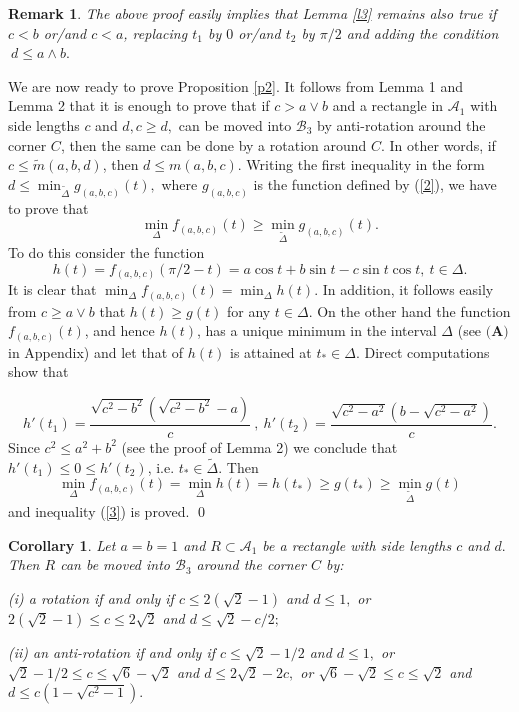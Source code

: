 \documentclass[12pt]{amsart}
\newtheorem{cor}[thm]{Corollary}
\newtheorem{rem}[thm]{Remark}
\def\A{\mathcal A}
\def\B{\mathcal B}
\def\DD{\Delta}
\def\w{\wedge}
\def\ss{\subset}
\begin{document}
\begin{rem}\label{r1} The above proof easily implies that Lemma \ref{l3}
remains also true if $c<b$ or/and $c<a$, replacing $t_1$ by $0$
or/and $t_2$ by $\pi/2$ and adding the condition $ \ d\le a\w b.$
\end{rem}

We are now ready to prove Proposition \ref{p2}. It follows from
Lemma 1 and Lemma 2 that it is enough to prove that if $c> a\vee b
$ and a rectangle in $\A_1$ with side lengths  $c$ and $d, c\ge d
,$ can be moved into $\B_3$ by anti-rotation around the corner
$C$, then the same can be done by a rotation around $C$. In other
words, if $c\le \widetilde{m}(a,b,d)$, then
 $d\le m(a,b,c).$ Writing  the first inequality in the form
$d\le \min_{\widetilde{\DD}}g_{(a,b,c)}(t) ,$ where $g_{(a,b,c)}$
is the function defined by (\ref{2}), we have to prove that
\begin{equation}\label{3}
\min_{\DD}f_{(a,b,c)}(t) \ge \min_{\widetilde{\DD}}g_{(a,b,c)}(t) .
\end{equation}
To do this consider the function
$$ h(t)= f_{(a,b,c)}(\pi/2-t)= a\cos t+b\sin t-c\sin t\cos t,\ t\in\DD.$$
It is clear that $\min_{\DD}f_{(a,b,c)}(t)=\min_{\DD}h(t).$ In
addition, it follows easily from $c\ge a\vee b $ that $h(t)\ge
g(t)$ for any $t\in\DD$. On the other hand the function
$f_{(a,b,c)}(t)$, and hence $h(t)$, has a unique minimum in the
interval $\DD$ (see $\textbf{(A)}$ in Appendix) and let that of
$h(t)$ is attained at $t_{\ast}\in \DD$. Direct computations show
that

$$h'(t_1) = \frac{\sqrt{c^2-b^2}(\sqrt{c^2-b^2}- a)}{c} \ ,
\ h'(t_2) = \frac{\sqrt{c^2-a^2}(b-\sqrt{c^2-a^2})}{c} .$$ Since
$c^2\le a^2+b^2$ (see the proof of Lemma 2) we conclude that
$h'(t_1)\le 0 \le h'(t_2)$, i.e. $t_{\ast}\in \widetilde{\DD}$.
Then
$$\min_{\DD}f_{(a,b,c)}(t)= \min_{\DD}h(t)=h(t_{\ast})\ge g(t_{\ast})\ge
\min_{\widetilde{\DD}}g(t)$$
and inequality (\ref{3}) is proved. \qed

\begin{cor}\label{cr 4} Let $a=b=1$ and $R\ss\A_1$ be a rectangle with side
lengths $c$ and  $d.$ Then $R$ can be moved into $\B_3$ around the
corner $C$ by:

(i) a rotation if and only if $c\le 2(\sqrt2-1)$ and $d\le 1,$ or
$2(\sqrt2-1)\le c\le 2\sqrt2$ and $d\le\sqrt{2}-c/2;$

(ii) an anti-rotation if and only if $c\le\sqrt2-1/2$ and $d\le 1,$ or
$\sqrt2-1/2\le c\le\sqrt6-\sqrt2$ and $d\le 2\sqrt2-2c,$ or
$\sqrt6-\sqrt2\le c\le\sqrt2$ and $d\le c(1-\sqrt{c^2-1}).$
\end{cor}
\end{document}
